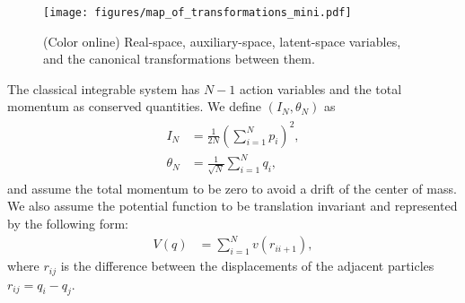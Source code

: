 
\begin{figure}[tp]
  \centering
  \texttt{[image: figures/map\_of\_transformations\_mini.pdf]}
  \caption{
    (Color online) Real-space, auxiliary-space, latent-space variables, and the canonical transformations between them.
    }
\label{fig:map_of_transformations}
\end{figure}
The classical integrable system has $N-1$ action variables and the total momentum as conserved quantities.
We define $(I_N, \theta_N)$ as
\begin{align}
  \begin{split}
    I_N & = \frac{1}{2N}\left(\sum_{i=1}^N p_i\right)^2, \\
    \theta_N & = \frac{1}{\sqrt{N}}\sum_{i=1}^N q_i,
  \end{split}
\end{align}
and assume the total momentum to be zero to avoid a drift of the center of mass.
We also assume the potential function to be translation invariant and represented by the following form:
\begin{align}
    V(q) & = \sum_{i=1}^{N}v(r_{ii+1}), \label{eq:chain}
\end{align}
where $r_{ij}$ is the difference between the displacements of the adjacent particles $r_{ij} = q_i - q_j$.

